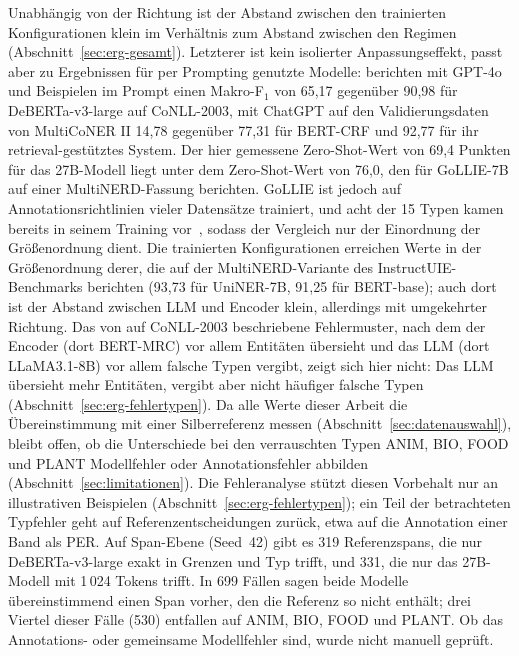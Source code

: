 Unabhängig von der Richtung ist der Abstand zwischen den trainierten
Konfigurationen klein im Verhältnis zum Abstand zwischen den Regimen
(Abschnitt~\ref{sec:erg-gesamt}).
Letzterer ist kein isolierter Anpassungseffekt, passt aber zu
Ergebnissen für per Prompting genutzte Modelle:
\textcite{keraghel2024recent} berichten mit GPT-4o und Beispielen im
Prompt einen Makro-F$_1$ von 65{,}17 gegenüber 90{,}98 für
DeBERTa-v3-large auf CoNLL-2003, \textcite{tan2023damo} mit ChatGPT auf
den Validierungsdaten von MultiCoNER II 14{,}78 gegenüber 77{,}31 für
BERT-CRF und 92{,}77 für ihr retrieval-gestütztes System.
Der hier gemessene Zero-Shot-Wert von 69,4 Punkten für das 27B-Modell
liegt unter dem Zero-Shot-Wert von 76,0, den \textcite{sainz2024gollie}
für GoLLIE-7B auf einer MultiNERD-Fassung berichten. GoLLIE ist jedoch
auf Annotationsrichtlinien vieler Datensätze trainiert, und acht der
15 Typen kamen bereits in seinem Training
vor~\cite[Tab.~6]{sainz2024gollie}, sodass der Vergleich nur der
Einordnung der Größenordnung dient.
Die trainierten Konfigurationen erreichen Werte in der Größenordnung
derer, die \textcite{zhou2024universalner} auf der MultiNERD-Variante
des InstructUIE-Benchmarks berichten (93{,}73 für UniNER-7B, 91{,}25 für
BERT-base); auch dort ist der Abstand zwischen
LLM und Encoder klein, allerdings mit umgekehrter Richtung.
Das von \textcite{zhan2026generativeNER} auf CoNLL-2003 beschriebene
Fehlermuster, nach dem der Encoder (dort BERT-MRC) vor allem Entitäten
übersieht und das LLM (dort LLaMA3.1-8B) vor allem falsche Typen
vergibt, zeigt sich hier nicht: Das LLM übersieht
mehr Entitäten, vergibt aber nicht häufiger falsche Typen
(Abschnitt~\ref{sec:erg-fehlertypen}).
Da alle Werte dieser Arbeit die Übereinstimmung mit einer
Silberreferenz messen (Abschnitt~\ref{sec:datenauswahl}), bleibt offen,
ob die Unterschiede bei den verrauschten Typen ANIM, BIO, FOOD und PLANT
Modellfehler oder Annotationsfehler abbilden
(Abschnitt~\ref{sec:limitationen}).
Die Fehleranalyse stützt diesen Vorbehalt nur an illustrativen
Beispielen (Abschnitt~\ref{sec:erg-fehlertypen}); ein Teil der betrachteten
Typfehler geht auf Referenzentscheidungen zurück, etwa auf die
Annotation einer Band als PER.
Auf Span-Ebene (Seed~42) gibt es 319 Referenzspans, die nur
DeBERTa-v3-large exakt in Grenzen und Typ trifft, und 331, die nur das
27B-Modell mit 1\,024 Tokens trifft.
In 699 Fällen sagen beide Modelle übereinstimmend einen Span vorher, den die
Referenz so nicht enthält; drei Viertel dieser Fälle (530) entfallen auf
ANIM, BIO, FOOD und PLANT.
Ob das Annotations- oder gemeinsame Modellfehler sind, wurde nicht
manuell geprüft.

